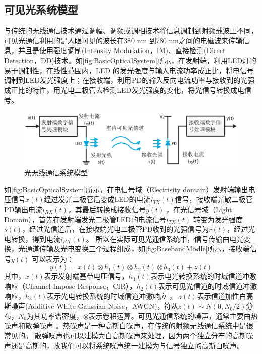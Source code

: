 \subsection{可见光系统模型}
与传统的无线通信技术通过调幅、调频或调相技术将信息调制到射频载波上不同，可见光通信利用的是人眼可见的波长在380 nm 到780 nm之间的电磁波来传输信息，并且是使用强度调制(Intensity Modulation，IM)、直接检测(Direct Detection，DD)技术。如\autoref{fig:BasicOpticalSystem}所示，在发射端，利用LED灯的易于调制性，在线性范围内，LED 的发光强度与输入电流功率成正比，将电信号调制到LED发光强度上；在接收端，利用PD的输入反向电流功率与接收到的光强成正比的特性，用光电二极管去检测LED发光强度的变化，将光信号转换成电信号。
\begin{figure}[htbp]
    \centering
    \includegraphics[width=\textwidth]{figures/chapter-2/BasicOpticalSystem.eps}
    \caption{光无线通信系统模型}
    \label{fig:BasicOpticalSystem}
\end{figure}
如\autoref{fig:BasicOpticalSystem}所示，在电信号域（Electrisity domain）发射端输出电压信号$x(t)$经过发光二极管后变成LED的电流$i_{TX}(t)$信号，接收端光敏二极管PD输出电流$i_{RX}(t)$，其最后转换成接收信号$y(t)$ ，在光信号域（Light Domain），首先在发射端发光二极管LED的电流信号$i_{TX}(t)$ 转变为发光强度$s(t)$，经过光信道后，在接收端光电二极管PD收到的光强信号为$r(t)$，经过光电转换，得到电流$i_{RX}(t)$。
所以在实际可见光通信系统中，信号传输由电光变换，光通道传输及光电变换三个过程组成，如\autoref{fig:BasebandModle}所示，接收端信号$y(t)$ 可以表示为：
\begin{equation}
    y(t)=x(t)\otimes h_1(t)\otimes h_2(t)\otimes h_3(t)+z(t)
\end{equation}
其中，$x(t)$表示发射端基带电压信号，$h_1(t)$表示电光转换系统的时域信道冲激响应（Channel Impose Response，CIR），$h_2(t)$表示可见光信道的时域信道冲激响应，$h_3(t)$表示光电转换系统的时域信道冲激响应
\cite{Yangxuecheng2015}，
$z(t)$表示信道加性白高斯噪声(Additive White Gaussian Noise，AWGN)，符从$z(t)\sim N(0,N_0/2)$分布，$N_0$为其功率谱密度，$\otimes$表示卷积运算。可见光通信系统的噪声，通常主要由热噪声和散弹噪声
\cite{Chenchunyan2014}。热噪声是一种高斯白噪声，在传统的射频无线通信系统中是很常见的。
散弹噪声也可以建模为白高斯噪声来处理，因为两个独立分布的高斯噪声还是高斯的，故我们可以将系统噪声统一建模为与信号独立的高斯白噪声。

